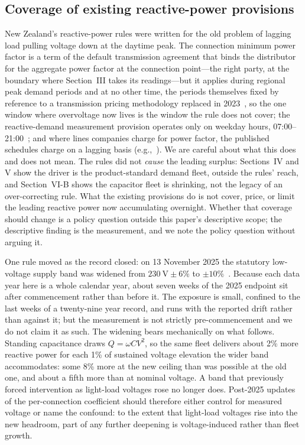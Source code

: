\documentclass[journal]{IEEEtran}
\begin{document}
\subsection{Coverage of existing reactive-power provisions}
New Zealand's reactive-power rules were written for the old problem of lagging load
pulling voltage down at the daytime peak. The connection minimum power factor is a
term of the default transmission agreement that binds the distributor for the
aggregate power factor at the connection point---the right party, at the boundary
where Section~III takes its readings---but it applies during regional peak demand
periods and at no other time, the periods themselves fixed by reference to a
transmission pricing methodology replaced in 2023~\cite{eipc_sch126}, so the one
window where overvoltage now lives is the window the rule does not cover; the
reactive-demand measurement provision operates only on weekday hours,
07:00--21:00~\cite{eipc_part8}; and where lines companies charge for power factor,
the published schedules charge on a lagging basis (e.g.,~\cite{powerco_pricing_fy26}). We are careful about
what this does and does not mean. The rules did not \emph{cause} the leading surplus:
Sections~IV and V show the driver is the product-standard demand fleet, outside the
rules' reach, and Section~VI-B shows the capacitor fleet is shrinking, not the legacy of an
over-correcting rule. What the existing provisions do is not cover, price, or limit
the leading reactive power now accumulating overnight. Whether that coverage should
change is a policy question outside this paper's descriptive scope; the descriptive
finding is the measurement, and we note the policy question without arguing it.

One rule moved as the record closed: on 13 November 2025 the statutory
low-voltage supply band was widened from $230~\mathrm{V}\pm6\%$ to
$\pm10\%$~\cite{esr_reg28}. Because each data year here is a whole calendar
year, about seven weeks of the 2025 endpoint sit after commencement rather than
before it. The exposure is small, confined to the last weeks of a twenty-nine
year record, and runs with the reported drift rather than against it; but the
measurement is not strictly pre-commencement and we do not claim it as such.
The widening bears mechanically on what follows. Standing capacitance draws
$Q=\omega CV^2$, so the same fleet delivers about 2\% more reactive power for
each 1\% of sustained voltage elevation the wider band accommodates: some 8\%
more at the new ceiling than was possible at the old one, and about a fifth
more than at nominal voltage. A band that previously forced intervention as
light-load voltages rose no longer does. Post-2025 updates of the
per-connection coefficient should therefore either control for measured voltage
or name the confound: to the extent that light-load voltages rise into the new
headroom, part of any further deepening is voltage-induced rather than fleet
growth.
\end{document}
